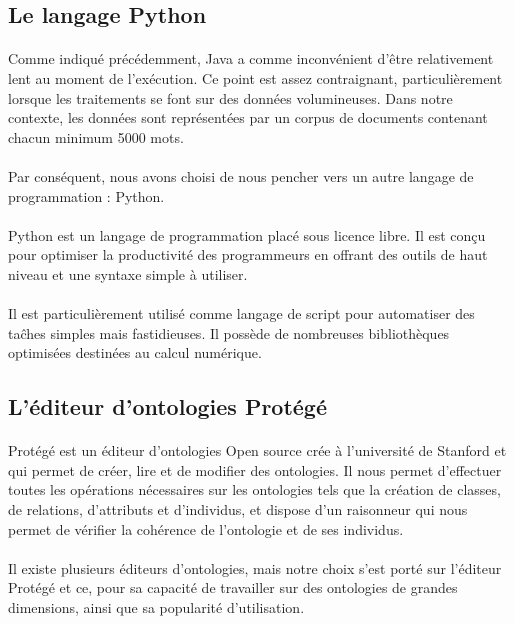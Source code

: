 \documentclass[12pt, a4paper, oneside]{book}
\begin{document}
\subsection{Le langage Python}
\paragraph{}
Comme indiqué précédemment, Java a comme inconvénient d'être relativement lent au moment de l'exécution.
Ce point est assez contraignant, particulièrement lorsque les traitements se font sur des données volumineuses.
Dans notre contexte, les données sont représentées par un corpus de documents contenant chacun minimum 5000 mots.
\paragraph{}
Par conséquent, nous avons choisi de nous pencher vers un autre langage de programmation : Python.
\paragraph{}
Python est un langage de programmation placé sous licence libre. Il est conçu pour optimiser la productivité des programmeurs en offrant des outils de haut 
niveau et une syntaxe simple à utiliser.
\paragraph{}
Il est particulièrement utilisé comme langage de script pour automatiser des taĉhes simples mais fastidieuses. Il possède de nombreuses bibliothèques optimisées destinées au calcul numérique.

\subsection{L'éditeur d'ontologies Protégé}
\paragraph{}
Protégé est un éditeur d'ontologies Open source crée à l'université de Stanford et qui permet de créer, lire et de modifier des ontologies. Il nous permet d'effectuer toutes les opérations nécessaires sur les ontologies tels que la création de classes, de relations, d'attributs et d'individus, et dispose d'un raisonneur qui nous permet de vérifier la cohérence de l'ontologie et de ses individus. 
\paragraph{}
Il existe plusieurs éditeurs d'ontologies, mais notre choix s'est porté sur l'éditeur Protégé et ce,  pour sa capacité de travailler sur des ontologies de grandes dimensions, ainsi que sa popularité d'utilisation.
\end{document}
